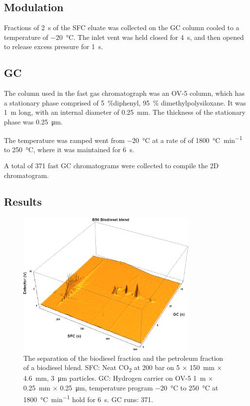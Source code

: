\subsection{Modulation}

Fractions of \SI{2}{\second} of the SFC eluate was collected on the GC column
cooled to a temperature of \SI{-20}{\celsius}. The inlet vent was held closed
for \SI{4}{\second}, and then opened to release excess pressure for
\SI{1}{\second}.

\subsection{GC}

The column used in the fast gas chromatograph was an OV-5 column, which has a
stationary phase comprised of \SI{5}{\percent}diphenyl, \SI{95}{\percent}
dimethylpolysiloxane. It was \SI{1}{\metre} long, with an internal diameter of
\SI{0.25}{\milli\metre}. The thickness of the stationary phase was
\SI{0.25}{\micro\metre}.

The temperature was ramped went from \SI{-20}{\celsius} at a rate of of
\SI{1800}{\celsius\per\minute} to \SI{250}{\celsius}, where it was maintained
for \SI{6}{s}.

A total of 371 fast GC chromatograms were collected to compile the 2D chromatogram. 

\subsection{Results}

\begin{figure}
	\centering
	\includegraphics[width=0.8\textwidth]{Figures/B50.png}
	\decoRule	
	
\caption[Biodiesel separated from petrodiesel.]{The separation of the biodiesel
fraction and the petroleum fraction of a biodiesel blend. SFC: Neat
CO\textsubscript{2} at 200 bar on 5 × \SI{150}{\milli\metre} ×
\SI{4.6}{\milli\metre}, \SI{3}{\micro\metre} particles. GC: Hydrogen carrier on
OV-5 \SI{1}{\metre} × \SI{0.25}{\milli\metre} × \SI{0.25}{\micro\metre},
temperature program \SI{-20}{\celsius} to \SI{250}{\celsius} at
\SI{1800}{\celsius\per\minute} hold for \SI{6}{\second}. GC runs: 371.}


	
	\label{fig:B50} 
\end{figure}

